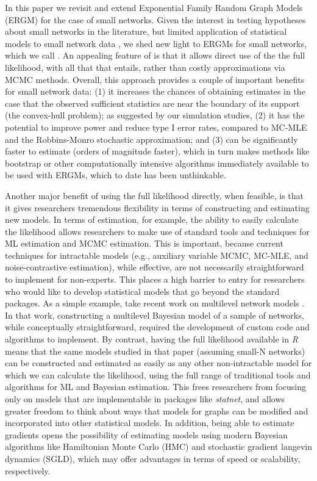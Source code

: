 \documentclass[review, nonatbib,doubleblind]{elsarticle/elsarticle}
\begin{document}
In this paper we revisit and extend Exponential Family Random Graph Models (ERGM) for the case of small networks. Given the interest in testing hypotheses about small networks in the literature, but limited application of statistical models to small network data \cite[][and others]{Robins2007,Holland1981,Frank1986,Wasserman1996,Snijders2006}, we shed new light to ERGMs for small networks, which we call \ergmitos{}. An appealing feature of \ergmitos{} is that it allows direct use of the the full likelihood, with all that that entails, rather than costly approximations via MCMC methods. Overall, this approach provides a couple of important benefits for small network data: (1) it increases the chances of obtaining estimates in  the case that the observed sufficient statistics are near the boundary of its support (the convex-hull problem); as suggested by our simulation studies, (2) it has the potential to improve power and reduce type I error rates, compared to MC-MLE and the Robbins-Monro stochastic approximation; and (3) \ergmitos{} can be significantly faster to estimate (orders of magnitude faster), which in turn makes methods like bootstrap or other computationally intensive algorithms immediately available to be used with ERGMs, which to date has been unthinkable.

Another major benefit of using the full likelihood directly, when feasible, is that it gives researchers tremendous flexibility in terms of constructing and estimating new models. In terms of estimation, for example, the ability to easily calculate the likelihood allows researchers to make use of standard tools and techniques for ML estimation and MCMC estimation. This is important, because current techniques for intractable models (e.g., auxiliary variable MCMC, MC-MLE, and noise-contrastive estimation), while effective, are not necessarily straightforward to implement for non-experts. This places a high barrier to entry for researchers who would like to develop statistical models that go beyond the standard packages. 
As a simple example, take recent work on multilevel network models \cite{slaughter2016multilevel}. In that work, constructing a multilevel Bayesian model of a sample of networks, while conceptually straightforward, required the development of custom code and algorithms to implement. By contrast, having the full likelihood available in \textit{R} means that the same models studied in that paper (assuming small-N networks) can be constructed and estimated as easily as any other non-intractable model for which we can calculate the likelihood, using the full range of traditional tools and algorithms for ML and Bayesian estimation. This frees researchers from focusing only on models that are implementable in packages like \textit{statnet}, and allows greater freedom to think about ways that models for graphs can be modified and incorporated into other statistical models. In addition, being able to estimate gradients opens the possibility of estimating models using modern Bayesian algorithms like Hamiltonian Monte Carlo (HMC) and stochastic gradient langevin dynamics (SGLD), which may offer advantages in terms of speed or scalability, respectively.
\end{document}
